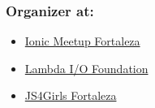 \documentclass[]{article}
\providecommand{\tightlist}{%
  \setlength{\itemsep}{0pt}\setlength{\parskip}{0pt}}
\begin{document}
\subsubsection{Organizer at:}\label{organizer-at}

\begin{itemize}
\tightlist
\item
  \href{http://ionicbrazil.com/}{Ionic Meetup Fortaleza}
\item
  \href{https://github.com/lambda-io}{Lambda I/O Foundation}
\item
  \href{http://js4girls-fortaleza.github.io/}{JS4Girls Fortaleza}
\end{itemize}
\end{document}
